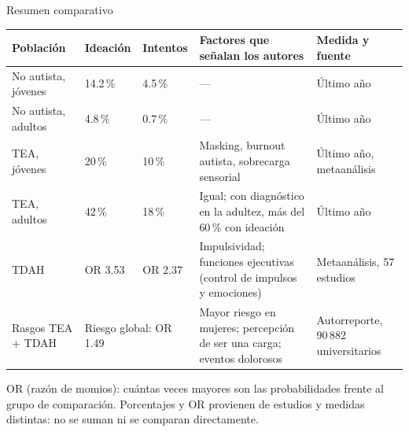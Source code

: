 \begin{frame}{Resumen comparativo}
  \begingroup\scriptsize
  \renewcommand{\arraystretch}{1.05}
  \begin{tabularx}{\textwidth}{@{}p{}p{}p{}Xp{}@{}}
    \toprule
    \textbf{Población} & \textbf{Ideación} & \textbf{Intentos} & \textbf{Factores que señalan los autores} & \textbf{Medida y fuente} \tabularnewline
    \midrule
    \raggedright No autista, jóvenes & 14.2\,\% & 4.5\,\% & \raggedright ---
      & \raggedright Último año \citep{conner2023} \tabularnewline
    \raggedright No autista, adultos & 4.8\,\% & 0.7\,\% & \raggedright ---
      & \raggedright Último año \citep{conner2023} \tabularnewline
    \raggedright TEA, jóvenes & 20\,\% & 10\,\%
      & \raggedright Masking, burnout autista, sobrecarga sensorial
      & \raggedright Último año, metaanálisis \citep{conner2023} \tabularnewline
    \raggedright TEA, adultos & 42\,\% & 18\,\%
      & \raggedright Igual; con diagnóstico en la adultez, más del 60\,\% con ideación
      & \raggedright Último año \citep{conner2023} \tabularnewline
    \raggedright TDAH
      & OR 3.53
      & OR 2.37
      & \raggedright Impulsividad; funciones ejecutivas (control de impulsos y emociones)
      & \raggedright Metaanálisis, 57 estudios \citep{septier2019,sun2024} \tabularnewline
    \raggedright Rasgos TEA + TDAH
      & \multicolumn{2}{l}{Riesgo global: OR 1.49}
      & \raggedright Mayor riesgo en mujeres; percepción de ser una carga; eventos dolorosos
      & \raggedright Autorreporte, 90\,882 universitarios \citep{sun2024,moseley2024} \tabularnewline
    \bottomrule
  \end{tabularx}
  \par\endgroup

  \vspace{0.2cm}
  {\scriptsize\color{gray!80}
  OR (razón de momios): cuántas veces mayores son las probabilidades frente al
  grupo de comparación. Porcentajes y OR provienen de estudios y medidas
  distintas: no se suman ni se comparan directamente.\par}
\end{frame}

